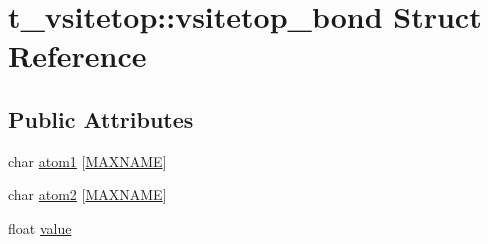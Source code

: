 \hypertarget{structt__vsitetop_1_1vsitetop__bond}{\section{t\-\_\-vsitetop\-:\-:vsitetop\-\_\-bond \-Struct \-Reference}
\label{structt__vsitetop_1_1vsitetop__bond}
}
\subsection*{\-Public \-Attributes}
\begin{DoxyCompactItemize}
\item 
char \hyperlink{structt__vsitetop_1_1vsitetop__bond_a1d8e8324cf0126ebca5e2238cee1310e}{atom1} \mbox{[}\hyperlink{gen__vsite_8c_ac881f02a50b29d3ffa5b1f4a0e4f9568}{\-M\-A\-X\-N\-A\-M\-E}\mbox{]}
\item 
char \hyperlink{structt__vsitetop_1_1vsitetop__bond_a269e7bd57c0d2a65b8d490f1e9198c24}{atom2} \mbox{[}\hyperlink{gen__vsite_8c_ac881f02a50b29d3ffa5b1f4a0e4f9568}{\-M\-A\-X\-N\-A\-M\-E}\mbox{]}
\item 
float \hyperlink{structt__vsitetop_1_1vsitetop__bond_a1e8342f8d04cf921a01749c1faeb13f0}{value}
\end{DoxyCompactItemize}


